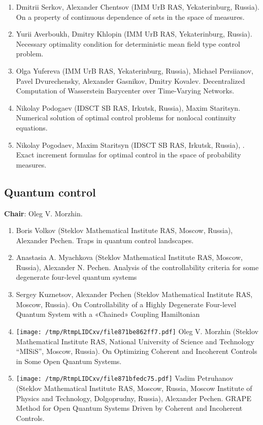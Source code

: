 \documentclass[
]{article}
\providecommand{\tightlist}{%
  \setlength{\itemsep}{0pt}\setlength{\parskip}{0pt}}
\begin{document}
\begin{enumerate}
\def\labelenumi{\arabic{enumi}.}
\tightlist
\item
  Dmitrii Serkov, Alexander Chentsov (IMM UrB RAS, Yekaterinburg,
  Russia). On a property of continuous dependence of sets in the space
  of measures.
\item
  Yurii Averboukh, Dmitry Khlopin (IMM UrB RAS, Yekaterinburg, Russia).
  Necessary optimality condition for deterministic mean field type
  control problem.
\item
  Olga Yufereva (IMM UrB RAS, Yekaterinburg, Russia), Michael
  Persiianov, Pavel Dvurechensky, Alexander Gasnikov, Dmitry Kovalev.
  Decentralized Computation of Wasserstein Barycenter over Time-Varying
  Networks.
\item
  Nikolay Podogaev (IDSCT SB RAS, Irkutsk, Russia), Maxim Staritsyn.
  Numerical solution of optimal control problems for nonlocal continuity
  equations.
\item
  Nikolay Pogodaev, Maxim Staritsyn (IDSCT SB RAS, Irkutsk, Russia),
  . Exact increment formulas
  for optimal control in the space of probability measures.
\end{enumerate}

\hypertarget{qc}{%
\subsection{Quantum control}\label{qc}}

\textbf{Chair}: Oleg V. Morzhin.

\begin{enumerate}
\def\labelenumi{\arabic{enumi}.}
\tightlist
\item
  Boris Volkov (Steklov Mathematical Institute RAS, Moscow, Russia),
  Alexander Pechen. Traps in quantum control landscapes.
\item
  Anastasia A. Myachkova (Steklov Mathematical Institute RAS, Moscow,
  Russia), Alexander N. Pechen. Analysis of the controllability criteria
  for some degenerate four-level quantum systems
\item
  Sergey Kuznetsov, Alexander Pechen (Steklov Mathematical Institute
  RAS, Moscow, Russia). On Controllability of a Highly Degenerate
  Four-level Quantum System with a «Chained» Coupling Hamiltonian
\item
  \protect\texttt{[image: /tmp/RtmpLIDCxv/file871be862ff7.pdf]}
  Oleg V. Morzhin (Steklov Mathematical Institute RAS, National
  University of Science and Technology ``MISiS'', Moscow, Russia). On
  Optimizing Coherent and Incoherent Controls in Some Open Quantum
  Systems.
\item
  \protect\texttt{[image: /tmp/RtmpLIDCxv/file871bfedc75.pdf]}
  Vadim Petruhanov (Steklov Mathematical Institute RAS, Moscow, Russia,
  Moscow Institute of Physics and Technology, Dolgoprudny, Russia),
  Alexander Pechen. GRAPE Method for Open Quantum Systems Driven by
  Coherent and Incoherent Controls.
\end{enumerate}
\end{document}
